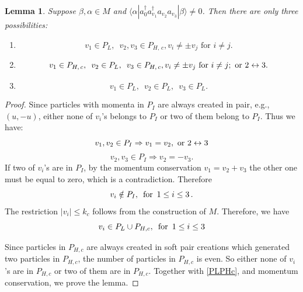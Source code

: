 \documentclass[11pt]{article}
\numberwithin{equation}{section}
\newcommand{\beq}{\begin{equation}}
\newcommand{\eeq}{\end{equation}}
\newcommand\al{{\alpha}}
\newcommand\be{\beta}
\newtheorem{lem}{Lemma}[section]
\theoremstyle{definition}
\begin{document}
\begin{lem}\label{posscombone0}
Suppose  $\be, \alpha \in M$ and $\langle \al| a^\dagger_{0}a^\dagger_{v_1}a_{v_2}a_{v_3}|\be\rangle\neq 0$. 
Then there are only three possibilities:
\begin{enumerate}
	\item 
	\beq\label{one0firstcase}
	v_1\in P_L,\,\,\,v_2, v_3\in P_{H,\,c},   v_{i} \not = \pm v_{j} \text{ for } i \not = j .
	\eeq
		\item 
	\beq\label{one0secondcase}
	v_1\in P_{H,\,c}, \,\,\,v_{2}\in P_L, \,\,\,v_{3}\in P_{H,\,c},  v_{i} \not = \pm v_{j} \text{ for } i \not = j; \text{ \rm or }  2 \leftrightarrow 3.
	\eeq
	\item  
	\beq\label{one0thirdcase}
	v_1\in P_L,\,\,\,v_2\in P_L,\,\,\,v_3\in P_L.
	\eeq
\end{enumerate}
\end{lem}
\begin{proof}
Since particles with momenta in   $P_I$ are always created in pair, e.g.,  $(u,-u)$, 
either none of $v_i$'s belongs to $P_I$ or two of them belong to $P_I$. Thus  we have:
 \beq 
 v_1,v_{2}\in P_I\Rightarrow v_1=v_{2}, \text{ \rm or }  2 \leftrightarrow 3
 \eeq
 \beq
 v_2,v_3\in P_I\Rightarrow v_2=-v_3.
 \eeq
If two of $v_i$'s are in $P_I$, by the momentum conservation $v_1=v_2+v_3$ the other one must be equal to zero, which is  a  contradiction. Therefore
\beq
 v_i\notin P_I,\,\,\,{\rm for}\,\,\,1\leq i\leq 3 \, .
\eeq  
The restriction  $|v_i|\leq k_c$ follows from the construction of $M$. 
 Therefore, we have
\beq\label{PLPHc}
 v_i\in P_L\cup P_{H,c},\,\,\,{\rm for}\,\,\,1\leq i\leq 3
 \eeq  
 
Since particles in  $P_{H,c}$ are always created in soft pair creations which generated two particles in  
$P_{H,c}$, the number of particles in $P_{H,c}$ is even. So either none of $v_i$'s are in $P_{H,c}$ or two of them are in $P_{H,c}$. Together with \eqref{PLPHc}, and momentum conservation, we prove the lemma.
 \end{proof}
 
\end{document}
